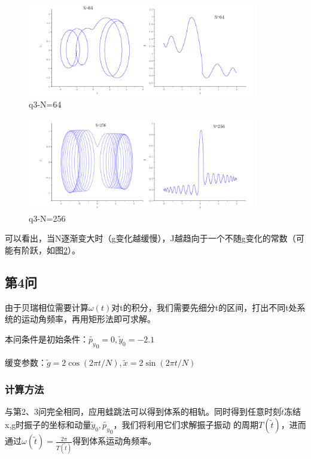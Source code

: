 \documentclass[10pt, a4paper]{article}
\newcommand{\wx}{\widetilde{x}}
\newcommand{\wy}{\widetilde{y}}
\newcommand{\wg}{\widetilde{g}}
\newcommand{\wt}{\widetilde{t}}
\newcommand{\wpy}{\widetilde{p_y}}
\begin{document}
    \begin{figure}[H]
        \centering
        \includegraphics[width=0.9\textwidth]{q3-N=64.jpg}
        \caption{q3-N=64}\label{q3-N=64}
    \end{figure}

    \begin{figure}[H]
        \centering
        \includegraphics[width=0.9\textwidth]{q3-N=256.jpg}
        \caption{q3-N=256}\label{q3-N=256}
    \end{figure}

    可以看出，当N逐渐变大时（g变化越缓慢），J越趋向于一个不随g变化的常数（可能有阶跃，如图\ref{q3-N=256}）。


    \subsection{第4问}

    由于贝瑞相位需要计算$\omega(t)$对t的积分，我们需要先细分t的区间，打出不同t处系统的运动角频率，再用矩形法即可求解。

    本问条件是初始条件：$\wpy_0=0,\wy_0=-2.1$

    缓变参数：$\wg=2\cos(2\pi t/N),\wx=2\sin(2\pi t/N)$

    \subsubsection{计算方法}

    与第2、3问完全相同，应用蛙跳法可以得到体系的相轨。同时得到任意时刻$\wt$冻结x,g时振子的坐标和动量$\wy_0,\wpy_0$，我们将利用它们求解振子振动
    的周期$T(\wt)$，进而通过$\omega(\wt)=\frac{2\pi}{T(\wt)}$得到体系运动角频率。
\end{document}
